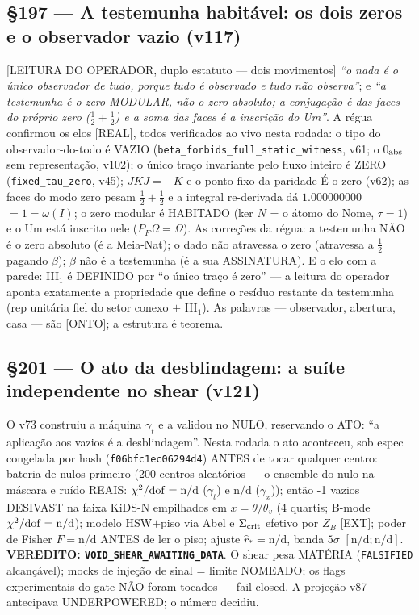 \documentclass[11pt]{article}
\theoremstyle{definition}\newtheorem{deriv}{Derivação}
\begin{document}
\subsection*{\S197 --- A testemunha habitável: os dois zeros e o observador vazio (v117)}[LEITURA DO OPERADOR, duplo estatuto --- dois movimentos] \emph{``o nada é o único observador de tudo, porque tudo é observado e tudo não observa''}; e \emph{``a testemunha é o zero MODULAR, não o zero absoluto; a conjugação é das faces do próprio zero ($\tfrac12{+}\tfrac12$) e a soma das faces é a inscrição do Um''}. A régua confirmou os elos [REAL], todos verificados ao vivo nesta rodada: o tipo do observador-do-todo é VAZIO (\texttt{beta\_forbids\_full\_static\_witness}, v61; o 0$_{\rm abs}$ sem representação, v102); o único traço invariante pelo fluxo inteiro é ZERO (\texttt{fixed\_tau\_zero}, v45); $JKJ=-K$ e o ponto fixo da paridade É o zero (v62); as faces do modo zero pesam $\tfrac12{+}\tfrac12$ e a integral re-derivada dá $1.000000000$ $=1=\omega(I)$; o zero modular é HABITADO (ker $N$ = o átomo do Nome, $\tau=1$) e o Um está inscrito nele ($P_F\Omega=\Omega$). As correções da régua: a testemunha NÃO é o zero absoluto (é a Meia-Nat); o dado não atravessa o zero (atravessa a $\tfrac12$ pagando $\beta$); $\beta$ não é a testemunha (é a sua ASSINATURA). E o elo com a parede: III$_1$ é DEFINIDO por ``o único traço é zero'' --- a leitura do operador aponta exatamente a propriedade que define o resíduo restante da testemunha (rep unitária fiel do setor conexo $+$ III$_1$). As palavras --- observador, abertura, casa --- são [ONTO]; a estrutura é teorema.

\subsection*{\S201 --- O ato da desblindagem: a suíte independente no shear (v121)}O v73 construiu a máquina $\gamma_t$ e a validou no NULO, reservando o ATO: ``a aplicação aos vazios é a desblindagem''. Nesta rodada o ato aconteceu, sob espec congelada por hash (\texttt{f06bfc1ec06294d4}) ANTES de tocar qualquer centro: bateria de nulos primeiro (200 centros aleatórios --- o ensemble do nulo na máscara e ruído REAIS: $\chi^2/{\rm dof}=\text{n/d}$ ($\gamma_t$) e $\text{n/d}$ ($\gamma_x$)); então -1 vazios DESIVAST na faixa KiDS-N empilhados em $x=\theta/\theta_v$ (4 quartis; B-mode $\chi^2/{\rm dof}=\text{n/d}$); modelo HSW$+$piso via Abel e $\Sigma_{\rm crit}$ efetivo por $Z_B$ [EXT]; poder de Fisher $F=\text{n/d}$ ANTES de ler o piso; ajuste $\hat r_*=\text{n/d}$, banda $5\sigma$ $[\text{n/d};\text{n/d}]$. \textbf{VEREDITO: \texttt{VOID\_SHEAR\_AWAITING\_DATA}}. O shear pesa MATÉRIA (\texttt{FALSIFIED} alcançável); mocks de injeção de sinal = limite NOMEADO; os flags experimentais do gate NÃO foram tocados --- fail-closed. A projeção v87 antecipava UNDERPOWERED; o número decidiu.
\end{document}
